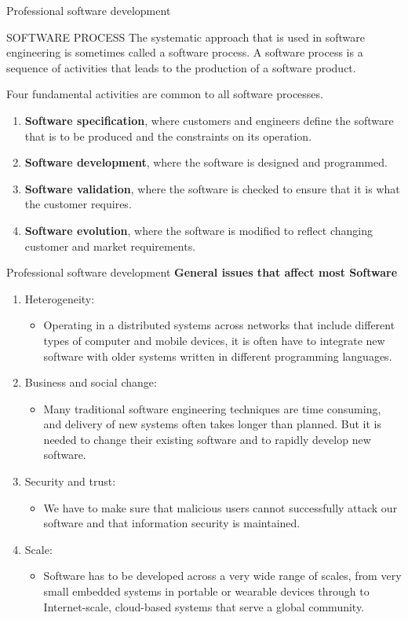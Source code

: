 \documentclass{beamer}
\begin{document}
\begin{frame}{Professional software development}
\begin{block}{SOFTWARE PROCESS}
The systematic approach that is used in software engineering is sometimes called 
a software process. A software process is a sequence of activities that leads to the 
production of a software product.
\end{block}
Four fundamental activities are common to all software processes.
\begin{enumerate}
	\item \textbf{Software specification}, where customers and engineers define the software that
	is to be produced and the constraints on its operation.
	\item \textbf{Software development}, where the software is designed and programmed.
	\item \textbf{Software validation}, where the software is checked to ensure that it is what the customer requires.
	\item \textbf{Software evolution}, where the software is modified to reflect changing customer and market requirements.
\end{enumerate}
\end{frame}
\begin{frame}{Professional software development}
\textbf{General issues that affect most Software}
\begin{enumerate}
	\item Heterogeneity:
	\begin{itemize}
		\item Operating in a distributed systems across networks that include different types of     computer and mobile devices, it is often have to integrate new software with older   systems written in different programming languages.
	\end{itemize}
	\item Business and social change:
	\begin{itemize}
		\item Many traditional software engineering techniques are time consuming, and delivery of new systems often takes longer than planned. But it is needed to change their       existing software and to rapidly develop new software.
	\end{itemize}
	\item Security and trust:
	\begin{itemize}
		\item We have to make sure that malicious users cannot successfully attack our software  and that information security is maintained.
	\end{itemize}
	\item Scale:
	\begin{itemize}
		\item Software has to be developed across a very wide range of scales, from very small    embedded systems in portable or wearable devices through to Internet-scale, cloud-based systems that serve a global community.
	\end{itemize}
\end{enumerate}
\end{frame}
\end{document}

